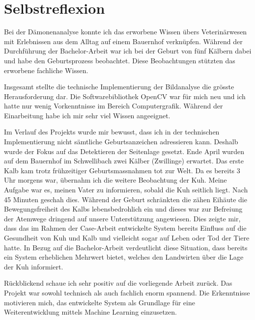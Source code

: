 

\chapter{Selbstreflexion}

Bei der Dämonenanalyse konnte ich das erworbene Wissen übers Veterinärwesen mit Erlebnissen aus dem Alltag auf einem Bauernhof verknüpfen. Während der Durchführung der Bachelor-Arbeit war ich bei der Geburt von fünf Kälbern dabei und habe den Geburtsprozess beobachtet. Diese Beobachtungen stützten das erworbene fachliche Wissen.

Insgesamt stellte die technische Implementierung der Bildanalyse die grösste Herausforderung dar. Die Softwarebibliothek OpenCV war für mich neu und ich hatte nur wenig Vorkenntnisse im Bereich Computergrafik. Während der Einarbeitung habe ich mir sehr viel Wissen angeeignet. 

Im Verlauf des Projekts wurde mir bewusst, dass ich in der technischen Implementierung nicht sämtliche Geburtsanzeichen adressieren kann. Deshalb wurde der Fokus auf das Detektieren der Seitenlage gesetzt. Ende April wurden auf dem Bauernhof im Schwellibach zwei Kälber (Zwillinge) erwartet. Das erste Kalb kam trotz frühzeitiger Geburtsmassnahmen tot zur Welt. Da es bereits 3 Uhr morgens war, übernahm ich die weitere Beobachtung der Kuh. Meine Aufgabe war es, meinen Vater zu informieren, sobald die Kuh seitlich liegt. Nach 45 Minuten geschah dies. Während der Geburt schränkten die zähen Eihäute die Bewegungsfreiheit des Kalbs lebensbedrohlich ein und dieses war zur Befreiung der Atemwege dringend auf unsere Unterstützung angewiesen. Dies zeigte mir, dass das im Rahmen der Case-Arbeit entwickelte System bereits Einfluss auf die Gesundheit von Kuh und Kalb und vielleicht sogar auf Leben oder Tod der Tiere hatte. In Bezug auf die Bachelor-Arbeit verdeutlicht diese Situation, dass bereits ein System erheblichen Mehrwert bietet, welches den Landwirten über die Lage der Kuh informiert. 

Rückblickend schaue ich sehr positiv auf die vorliegende Arbeit zurück. Das Projekt war sowohl technisch als auch fachlich enorm spannend. Die Erkenntnisse motivieren mich, das entwickelte System als Grundlage für eine Weiterentwicklung mittels Machine Learning einzusetzen.